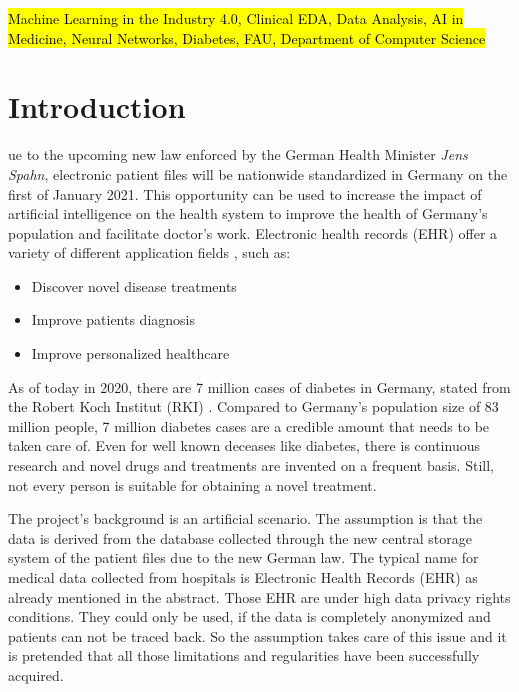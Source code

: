\documentclass[journal]{IEEEtran}
\begin{document}
\begin{IEEEkeywords}
\hl{Machine Learning in the Industry 4.0, Clinical EDA, Data Analysis, AI in Medicine, Neural Networks, Diabetes, FAU, Department of Computer Science}
\end{IEEEkeywords}

\IEEEpeerreviewmaketitle

\section{Introduction}
ue to the upcoming new law enforced by the German Health Minister \textit{Jens Spahn}, electronic patient files will be nationwide standardized in Germany \cite{spahn} on the first of January 2021. This opportunity can be used to increase the impact of artificial intelligence on the health system to improve the health of Germany's population and facilitate doctor's work. Electronic health records (EHR) offer a variety of different application fields \cite{cite1} \cite{cite2}, such as: \\

\begin{itemize}
	\item Discover novel disease treatments
	\item Improve patients diagnosis
	\item Improve personalized healthcare \\
\end{itemize}

As of today in 2020, there are 7 million cases of diabetes in Germany, stated from the Robert Koch Institut (RKI) \cite{diab}. Compared to Germany's population size of 83 million people, 7 million diabetes cases are a credible amount that needs to be taken care of. Even for well known deceases like diabetes, there is continuous research and novel drugs and treatments are invented on a frequent basis. Still, not every person is suitable for obtaining a novel treatment. 

The project's background is an artificial scenario. The assumption is that the data is derived from the database collected through the new central storage system of the patient files due to the new German law. The typical name for medical data collected from hospitals is Electronic Health Records (EHR) as already mentioned in the abstract. Those EHR are under high data privacy rights conditions. They could only be used, if the data is completely anonymized and patients can not be traced back. So the assumption takes care of this issue and it is pretended that all those limitations and regularities have been successfully acquired.
\end{document}
